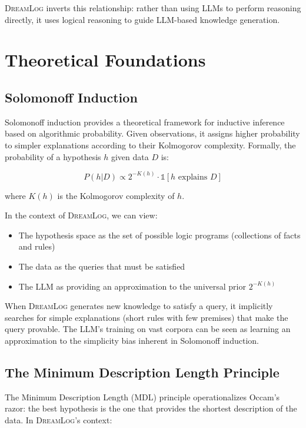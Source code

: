 \documentclass[11pt,a4paper]{article}
\newcommand{\dreamlog}{\textsc{DreamLog}}
\begin{document}
\dreamlog{} inverts this relationship: rather than using LLMs to perform reasoning directly, it uses logical reasoning to guide LLM-based knowledge generation.

\section{Theoretical Foundations}

\subsection{Solomonoff Induction}

Solomonoff induction \citep{solomonoff1964formal} provides a theoretical framework for inductive inference based on algorithmic probability. Given observations, it assigns higher probability to simpler explanations according to their Kolmogorov complexity. Formally, the probability of a hypothesis $h$ given data $D$ is:

\begin{equation}
P(h|D) \propto 2^{-K(h)} \cdot \mathbb{1}[h \text{ explains } D]
\end{equation}

where $K(h)$ is the Kolmogorov complexity of $h$.

In the context of \dreamlog{}, we can view:
\begin{itemize}
\item The hypothesis space as the set of possible logic programs (collections of facts and rules)
\item The data as the queries that must be satisfied
\item The LLM as providing an approximation to the universal prior $2^{-K(h)}$
\end{itemize}

When \dreamlog{} generates new knowledge to satisfy a query, it implicitly searches for simple explanations (short rules with few premises) that make the query provable. The LLM's training on vast corpora can be seen as learning an approximation to the simplicity bias inherent in Solomonoff induction.

\subsection{The Minimum Description Length Principle}

The Minimum Description Length (MDL) principle \citep{rissanen1978modeling} operationalizes Occam's razor: the best hypothesis is the one that provides the shortest description of the data. In \dreamlog{}'s context:
\end{document}
